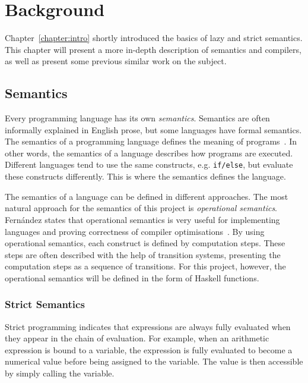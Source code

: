 \chapter{Background}
Chapter~\ref{chapter:intro} shortly introduced the basics of lazy and strict
semantics. This chapter will present a more in-depth description of semantics
and compilers, as well as present some previous similar work on the subject.

\section{Semantics}
Every programming language has its own \textit{semantics}. Semantics are often
informally explained in English prose, but some languages have formal semantics.
The semantics of a programming language defines
the meaning of programs~\cite{Fernand:PLangOpSem}.
In other words, the semantics of a language describes how programs are executed.
Different languages tend to use the same constructs, e.g. \texttt{if/else}, but
evaluate these constructs differently. This is where the semantics defines the
language.

The semantics of a language can be defined in different approaches. The most
natural approach for the semantics of this project is
\textit{operational semantics}. Fernández states that operational semantics
is very useful for implementing languages and proving correctness of compiler
optimisations~\cite{Fernand:PLangOpSem}. By using operational
semantics, each construct is defined by computation steps. These steps are
often described with the help of transition systems, presenting the computation
steps as a sequence of transitions. For this project, however,
the operational semantics will be defined in the form of Haskell functions.


\subsection{Strict Semantics}
Strict programming indicates that expressions are always fully evaluated when
they appear in the chain of evaluation. For example, when an arithmetic expression
is bound to a variable, the expression is fully evaluated to become a numerical
value before being assigned to the variable. The value is then accessible
by simply calling the variable.

